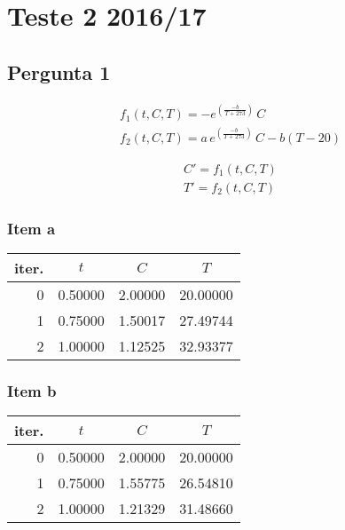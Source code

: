 \setcounter{chapter}{15}
\chapter{Teste 2 2016/17}
{
\renewcommand{\thesubsection}{\thesection\alph{subsection}}
\section{Pergunta 1}
\begin{center}
\begin{minipage}[c]{0.5\textwidth}
\begin{gather*}
	f_1(t,C,T) = -e^{\left(\frac{-b}{T+273}\right)}\,C\\
	f_2(t,C,T) = a\,e^{\left(\frac{-b}{T+273}\right)}\,C -b(T-20)
\end{gather*}
\end{minipage}%
\begin{minipage}[c]{0.5\textwidth}
\begin{gather*}
	C' = f_1(t,C,T)\\
	T' = f_2(t,C,T)
\end{gather*}
\end{minipage}
\end{center}
%
\begin{center}
\begin{minipage}[c]{0.5\textwidth}
\subsection{Item a}
\begin{center}\begin{tabular}{r | c c c}
	iter. & $t$ & $C$ & $T$ \\ \hline
	0     & 0.50000 & 2.00000 & 20.00000 \\
	1     & 0.75000 & 1.50017 & 27.49744 \\
	2     & 1.00000 & 1.12525 & 32.93377
\end{tabular} \end{center}
\end{minipage}%
\begin{minipage}[c]{0.5\textwidth}
\subsection{Item b}
\begin{center}\begin{tabular}{r | c c c}
	iter. & $t$ & $C$ & $T$ \\ \hline
	0     & 0.50000 & 2.00000 & 20.00000 \\
	1     & 0.75000 & 1.55775 & 26.54810 \\
	2     & 1.00000 & 1.21329 & 31.48660
\end{tabular} \end{center}
\end{minipage}
\end{center}
}
